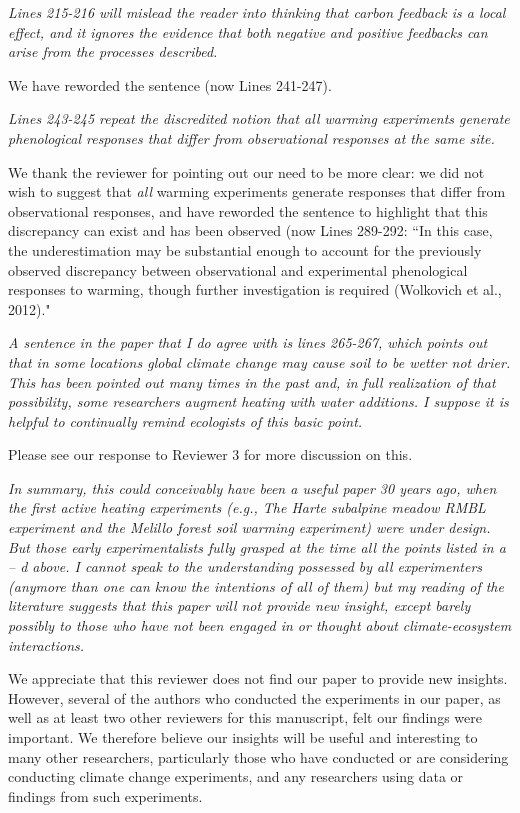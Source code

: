 \documentclass[11pt,a4paper]{letter}
\begin{document}
\begin{letter}{}
\emph  {Lines 215-216 will mislead the reader into thinking that carbon feedback is a local effect, and it ignores the evidence that both negative and positive feedbacks can arise from the processes described.}  
\par We have reworded the sentence (now Lines 241-247).

\emph {Lines 243-245 repeat the discredited notion that all warming experiments generate phenological responses that differ from observational responses at the same site. } 
\par We thank the reviewer for pointing out our need to be more clear: we did not wish to suggest that \emph{all} warming experiments generate responses that differ from observational responses, and have reworded the sentence to highlight that this discrepancy can exist and has been observed (now Lines 289-292:  ``In this
case, the underestimation may be substantial enough to account for the previously observed discrepancy between observational and experimental phenological responses to warming, though further investigation is required (Wolkovich et al., 2012)."

\emph{A sentence in the paper that I do agree with is lines 265-267, which points out that in some locations global climate change may cause soil to be wetter not drier.  This has been pointed out many times in the past and, in full realization of that possibility, some researchers augment heating with water additions.  I suppose it is helpful to continually remind ecologists of this basic point.}
\par Please see our response to Reviewer 3 for more discussion on this.

\emph{In summary, this could conceivably have been a useful paper 30 years ago, when the first active heating experiments (e.g., The Harte subalpine meadow RMBL experiment and the Melillo forest soil warming experiment) were under design.  But those early experimentalists fully grasped at the time all the points listed in a -- d above.  I cannot speak to the understanding possessed by all experimenters (anymore than one can know the intentions of all of them) but my reading of the literature suggests that this paper will not provide new insight, except barely possibly to those who have not been engaged in or thought about climate-ecosystem interactions.} 
\par We appreciate that this reviewer does not find our paper to provide new insights. However, several of the authors who conducted the experiments in our paper, as well as at least two other reviewers for this manuscript, felt our findings were important. We therefore believe our insights will be useful and interesting to many other researchers, particularly  those who have conducted or are considering conducting climate change experiments, and any researchers using data or findings from such experiments.


\end{letter}
\end{document}
